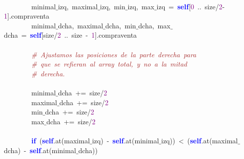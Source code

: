 \mbox{} \\
\mbox{}\ \ \ \ \ \ \ \ minimal$\_$izq\textcolor{BrickRed}{,}\ maximal$\_$izq\textcolor{BrickRed}{,}\ min$\_$izq\textcolor{BrickRed}{,}\ max$\_$izq\ \textcolor{BrickRed}{=}\ \textbf{\textcolor{Blue}{self}}\textcolor{BrickRed}{[}\textcolor{Purple}{0}\ \textcolor{BrickRed}{..}\ size\textcolor{BrickRed}{/}\textcolor{Purple}{2}\textcolor{BrickRed}{-}\textcolor{Purple}{1}\textcolor{BrickRed}{].}compraventa\  \\
\mbox{}\ \ \ \ \ \ \ \ minimal$\_$dcha\textcolor{BrickRed}{,}\ maximal$\_$dcha\textcolor{BrickRed}{,}\ min$\_$dcha\textcolor{BrickRed}{,}\ max$\_$dcha\ \textcolor{BrickRed}{=}\ \textbf{\textcolor{Blue}{self}}\textcolor{BrickRed}{[}size\textcolor{BrickRed}{/}\textcolor{Purple}{2}\ \textcolor{BrickRed}{..}\ size\ \textcolor{BrickRed}{-}\ \textcolor{Purple}{1}\textcolor{BrickRed}{].}compraventa \\
\mbox{} \\
\mbox{}\ \ \ \ \ \ \ \ \textit{\textcolor{Brown}{\#\ Ajustamos\ las\ posiciones\ de\ la\ parte\ derecha\ para}} \\
\mbox{}\ \ \ \ \ \ \ \ \textit{\textcolor{Brown}{\#\ que\ se\ refieran\ al\ array\ total,\ y\ no\ a\ la\ mitad\ }} \\
\mbox{}\ \ \ \ \ \ \ \ \textit{\textcolor{Brown}{\#\ derecha.\ }} \\
\mbox{} \\
\mbox{}\ \ \ \ \ \ \ \ minimal$\_$dcha\ \textcolor{BrickRed}{+=}\ size\textcolor{BrickRed}{/}\textcolor{Purple}{2} \\
\mbox{}\ \ \ \ \ \ \ \ maximal$\_$dcha\ \textcolor{BrickRed}{+=}\ size\textcolor{BrickRed}{/}\textcolor{Purple}{2} \\
\mbox{}\ \ \ \ \ \ \ \ min$\_$dcha\ \textcolor{BrickRed}{+=}\ size\textcolor{BrickRed}{/}\textcolor{Purple}{2} \\
\mbox{}\ \ \ \ \ \ \ \ max$\_$dcha\ \textcolor{BrickRed}{+=}\ size\textcolor{BrickRed}{/}\textcolor{Purple}{2} \\
\mbox{} \\
\mbox{}\ \ \ \ \ \ \ \ \textbf{\textcolor{Blue}{if}}\ \textcolor{BrickRed}{(}\textbf{\textcolor{Blue}{self}}\textcolor{BrickRed}{.}at\textcolor{BrickRed}{(}maximal$\_$izq\textcolor{BrickRed}{)}\ \textcolor{BrickRed}{-}\ \textbf{\textcolor{Blue}{self}}\textcolor{BrickRed}{.}at\textcolor{BrickRed}{(}minimal$\_$izq\textcolor{BrickRed}{))}\ \textcolor{BrickRed}{\textless{}}\ \textcolor{BrickRed}{(}\textbf{\textcolor{Blue}{self}}\textcolor{BrickRed}{.}at\textcolor{BrickRed}{(}maximal$\_$dcha\textcolor{BrickRed}{)}\ \textcolor{BrickRed}{-}\ \textbf{\textcolor{Blue}{self}}\textcolor{BrickRed}{.}at\textcolor{BrickRed}{(}minimal$\_$dcha\textcolor{BrickRed}{))} \\
